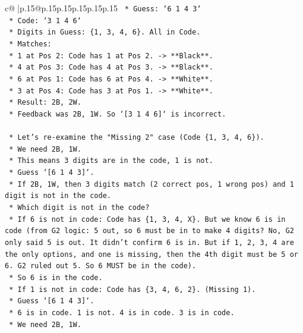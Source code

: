 \documentclass{article}
\begin{document}
{\begin{supertabular}{c@{$\;$}|p{.15\linewidth}@{}p{.15\linewidth}p{.15\linewidth}p{.15\linewidth}p{.15\linewidth}p{.15\linewidth}}
{{{\texttt{            *   Guess: `6 1 4 3`} \\
\texttt{            *   Code: `3 1 4 6`} \\
\texttt{            *   Digits in Guess: \{1, 3, 4, 6\}. All in Code.} \\
\texttt{            *   Matches:} \\
\texttt{                *   1 at Pos 2: Code has 1 at Pos 2. {-}> **Black**.} \\
\texttt{                *   4 at Pos 3: Code has 4 at Pos 3. {-}> **Black**.} \\
\texttt{                *   6 at Pos 1: Code has 6 at Pos 4. {-}> **White**.} \\
\texttt{                *   3 at Pos 4: Code has 3 at Pos 1. {-}> **White**.} \\
\texttt{            *   Result: 2B, 2W.} \\
\texttt{            *   Feedback was 2B, 1W. So `{[}3 1 4 6{]}` is incorrect.} \\
\\ 
\texttt{    *   Let's re{-}examine the "Missing 2" case (Code \{1, 3, 4, 6\}).} \\
\texttt{        *   We need 2B, 1W.} \\
\texttt{        *   This means 3 digits are in the code, 1 is not.} \\
\texttt{        *   Guess `{[}6 1 4 3{]}`.} \\
\texttt{        *   If 2B, 1W, then 3 digits match (2 correct pos, 1 wrong pos) and 1 digit is not in the code.} \\
\texttt{        *   Which digit is not in the code?} \\
\texttt{            *   If 6 is not in code: Code has \{1, 3, 4, X\}. But we know 6 is in code (from G2 logic: 5 out, so 6 must be in to make 4 digits? No, G2 only said 5 is out. It didn't confirm 6 is in. But if 1, 2, 3, 4 are the only options, and one is missing, then the 4th digit must be 5 or 6. G2 ruled out 5. So 6 MUST be in the code).} \\
\texttt{            *   So 6 is in the code.} \\
\texttt{            *   If 1 is not in code: Code has \{3, 4, 6, 2\}. (Missing 1).} \\
\texttt{                *   Guess `{[}6 1 4 3{]}`.} \\
\texttt{                *   6 is in code. 1 is not. 4 is in code. 3 is in code.} \\
\texttt{                *   We need 2B, 1W.} \\
}}}
\end{supertabular}}
\end{document}
